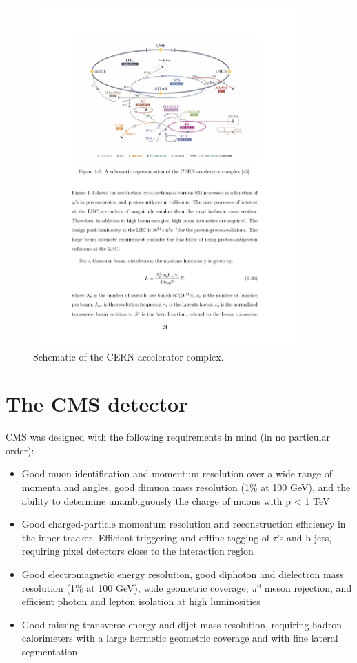 \begin{figure}[hbtp]
\centering
\includegraphics[width=0.9\textwidth]{figures/lhc_protons.pdf}
\caption{Schematic of the CERN accelerator complex.}
\label{fig:lhc}
\end{figure}


\section{The CMS detector}

CMS was designed with the following requirements in mind (in no particular order):
\begin{itemize}
\item Good muon identification and momentum resolution over a wide range of momenta and
angles, good dimuon mass resolution (1\% at 100 GeV), and the ability to determine unambiguously
the charge of muons with p < 1 TeV
\item Good charged-particle momentum resolution and reconstruction efficiency in the inner
tracker. Efficient triggering and offline tagging of $\tau$'s and b-jets, requiring pixel detectors
close to the interaction region
\item Good electromagnetic energy resolution, good diphoton and dielectron mass resolution (1\% at 100 GeV),
wide geometric coverage, ${\pi}^{0}$ meson rejection, and efficient photon and lepton
isolation at high luminosities
\item Good missing transverse energy and dijet mass resolution, requiring hadron calorimeters
with a large hermetic geometric coverage and with fine lateral segmentation
\end{itemize}

